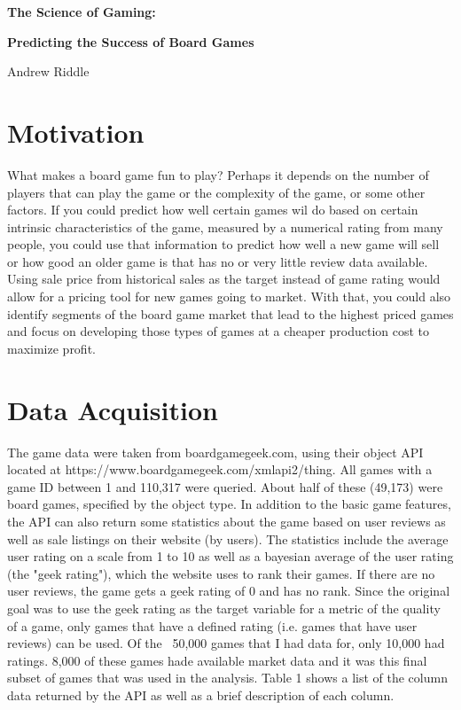 \documentclass[12pt]{article}
\begin{document}
\begin{center}
\textbf{The Science of Gaming:}

\textbf{Predicting the Success of Board Games}

Andrew Riddle
\end{center}

\section{Motivation}
What makes a board game fun to play? Perhaps it depends on the number of players that can play the game or the complexity of the game, or some other factors. If you could predict how well certain games wil do based on certain intrinsic characteristics of the game, measured by a numerical rating from many people, you could use that information to predict how well a new game will sell or how good an older game is that has no or very little review data available. Using sale price from historical sales as the target instead of game rating would allow for a pricing tool for new games going to market. With that, you could also identify segments of the board game market that lead to the highest priced games and focus on developing those types of games at a cheaper production cost to maximize profit.

\section{Data Acquisition}
The game data were taken from boardgamegeek.com, using their object API located at https://www.boardgamegeek.com/xmlapi2/thing. All games with a game ID between 1 and 110,317 were queried. About half of these (49,173) were board games, specified by the object type. In addition to the basic game features, the API can also return some statistics about the game based on user reviews as well as sale listings on their website (by users). The statistics include the average user rating on a scale from 1 to 10 as well as a bayesian average of the user rating (the "geek rating"), which the website uses to rank their games. If there are no user reviews, the game gets a geek rating of 0 and has no rank. Since the original goal was to use the geek rating as the target variable for a metric of the quality of a game, only games that have a defined rating (i.e. games that have user reviews) can be used. Of the ~50,000 games that I had data for, only 10,000 had ratings. 8,000 of these games hade available market data and it was this final subset of games that was used in the analysis. Table 1 shows a list of the column data returned by the API as well as a brief description of each column. 
\end{document}

